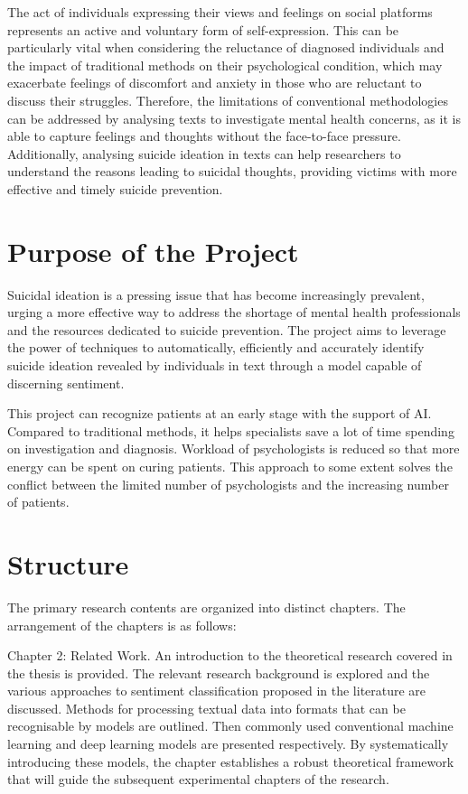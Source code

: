 \documentclass[ %
                    author={Bocheng Wang},
                supervisor={Dr. Qiang Liu},
                    degree={MSc},
                     title={A Research on Identification of Suicide Ideation in Texts with Multiple Models},
                      type={},
                      year={2024}]{dissertation}
\begin{document}
The act of individuals expressing their views and feelings on social platforms represents an active and voluntary form of self-expression. This can be particularly vital when considering the reluctance of diagnosed individuals and the impact of traditional methods on their psychological condition, which may exacerbate feelings of discomfort and anxiety in those who are reluctant to discuss their struggles. Therefore, the limitations of conventional methodologies can be addressed by analysing texts to investigate mental health concerns, as it is able to capture feelings and thoughts without the face-to-face pressure. Additionally, analysing suicide ideation in texts can help researchers to understand the reasons leading to suicidal thoughts, providing victims with more effective and timely suicide prevention.

\section{Purpose of the Project}
\noindent
Suicidal ideation is a pressing issue that has become increasingly prevalent, urging a more effective way to address the shortage of mental health professionals and the resources dedicated to suicide prevention. The project aims to leverage the power of techniques to automatically, efficiently and accurately identify suicide ideation revealed by individuals in text through a model capable of discerning sentiment.

This project can recognize patients at an early stage with the support of AI. Compared to traditional methods, it helps specialists save a lot of time spending on investigation and diagnosis. Workload of psychologists is reduced so that more energy can be spent on curing patients. This approach to some extent solves the conflict between the limited number of psychologists and the increasing number of patients.

\section{Structure}
\noindent
The primary research contents are organized into distinct chapters. The arrangement of the chapters is as follows:

Chapter 2: Related Work. An introduction to the theoretical research covered in the thesis is provided. The relevant research background is explored and the various approaches to sentiment classification proposed in the literature are discussed. Methods for processing textual data into formats that can be recognisable by models are outlined. Then commonly used conventional machine learning and deep learning models are presented respectively. By systematically introducing these models, the chapter establishes a robust theoretical framework that will guide the subsequent experimental chapters of the research.
\end{document}
